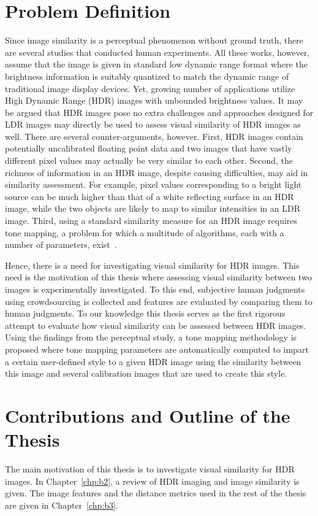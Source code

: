 \section{ Problem Definition}
Since image similarity is a perceptual phenomenon without ground truth, there are several studies that conducted human experiments. All these works, however, assume that the image is given in standard low dynamic range format where the brightness information is suitably quantized to match the dynamic range of traditional image display devices. Yet, growing number of applications utilize High Dynamic Range (HDR) images with unbounded brightness values. It may be argued that HDR images pose no extra challenges and approaches designed for LDR images may directly be used to assess visual similarity of HDR images as well. There are several counter-arguments, however. First, HDR images contain potentially uncalibrated floating point data and two images that have vastly different pixel values may actually be very similar to each other. Second, the richness of information in an HDR image, despite causing difficulties, may aid in similarity assessment. For example, pixel values corresponding to a bright light source can be much higher than that of a white reflecting surface in an HDR image, while the two objects are likely to map to similar intensities in an LDR image. Third, using a standard similarity measure for an HDR image requires tone mapping, a problem for which a multitude of algorithms, each with a number of parameters, exist~\cite{yeganeh2012objective}.

Hence, there is a need for investigating visual similarity for HDR images. This need is the motivation of this thesis where assessing visual similarity between two images is experimentally investigated. To this end, subjective human judgments using crowdsourcing is collected and features are evaluated by comparing them to human judgments. To our knowledge this thesis serves as the first rigorous attempt to evaluate how visual similarity can be assessed between HDR images. Using the findings from the perceptual study, a tone mapping methodology is proposed where tone mapping parameters are automatically computed to impart a certain user-defined style to a given HDR image using the similarity between this image and several calibration images that are used to create this style.

\section{Contributions and Outline of the Thesis}
The main motivation of this thesis is to investigate visual similarity for HDR images. In Chapter~\ref{chp:b2}, a review of HDR imaging and image similarity is given. The image features and the distance metrics used in the rest of the thesis are given in Chapter~\ref{chp:b3}.


